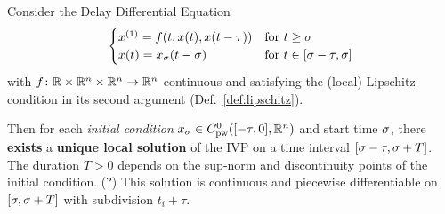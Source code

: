     \begin{theorem}\label{thm:solution-existence}
        Consider the Delay Differential Equation
        \begin{equation}
            \begin{cases}
                \D{x} = f(t,x(t),x(t-\tau)) & \text{for } t\geq\tzero\\
                x(t) = x_\tzero(t-\tzero)   & \text{for } t\in [\tzero-\tau,\tzero]
            \end{cases}
        \end{equation}
        with $f\colon\mathbb{R}\times\mathbb{R}^n\times\mathbb{R}^n\to\mathbb{R}^n$ continuous and satisfying the (local) Lipschitz condition in its second argument (Def.~\ref{def:lipschitz}).


        Then for each \emph{initial condition} $x_{\tzero}\in\statespace[\tau]$ and start time $\sigma$, there \textbf{exists} a \textbf{unique local solution} of the IVP on a time interval $[\sigma-\tau, \sigma+T]$. The duration $T>0$ depends on the sup-norm and discontinuity points of the initial condition. (?)
        This solution is continuous and piecewise differentiable on $[\sigma,\sigma+T]$ with subdivision $t_i+\tau$.
    \end{theorem}

